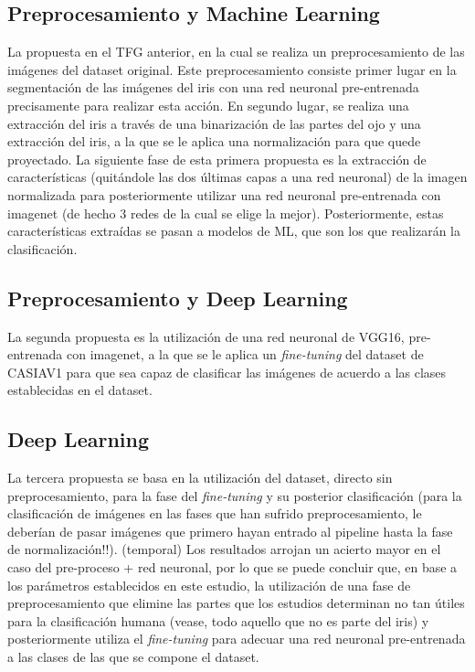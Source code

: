 \subsection{Preprocesamiento y Machine Learning}

La propuesta en el TFG anterior, en la cual se realiza un preprocesamiento de las imágenes del dataset original. Este preprocesamiento consiste primer lugar 
en la segmentación de las imágenes del iris con una red neuronal pre-entrenada precisamente para realizar esta acción. En segundo lugar, se realiza una extracción
del iris a través de una binarización de las partes del ojo y una extracción del iris, a la que se le aplica una normalización para que quede proyectado.
La siguiente fase de esta primera propuesta es la extracción de características (quitándole las dos últimas capas a una red neuronal) de la imagen normalizada
 para posteriormente utilizar una red neuronal pre-entrenada con imagenet (de hecho 3 redes de la cual se elige la mejor). Posteriormente, estas características
 extraídas se pasan a modelos de ML, que son los que realizarán la clasificación. 

\subsection{Preprocesamiento y Deep Learning}

La segunda propuesta es la utilización de una red neuronal de VGG16, pre-entrenada con imagenet, a la que se le aplica un \textit{fine-tuning} del dataset de CASIAV1 para
que sea capaz de clasificar las imágenes de acuerdo a las clases establecidas en el dataset.

\subsection{Deep Learning}

La tercera propuesta se basa en la utilización del dataset, directo sin preprocesamiento, para la fase del \textit{fine-tuning} y su posterior clasificación (para la clasificación de imágenes en las fases
que han sufrido preprocesamiento, le deberían de pasar imágenes que primero hayan entrado al pipeline hasta la fase de normalización!!).
(temporal) Los resultados arrojan un acierto mayor en el caso del pre-proceso + red neuronal, por lo que se puede concluir que, en base a los parámetros establecidos en este estudio, la utilización de 
una fase de preprocesamiento que elimine las partes que los estudios determinan no tan útiles para la clasificación humana (vease, todo aquello que no es parte del iris)
 y posteriormente utiliza el \textit{fine-tuning} para adecuar una red neuronal pre-entrenada a las clases de las que se compone el dataset.

